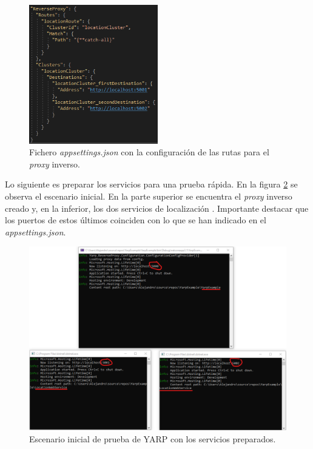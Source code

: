 \documentclass[11pt,spanish,listoffigures]{tfgetsinf}
\begin{document}
\begin{figure}[ht]
\centering
\includegraphics[width=0.5\textwidth]{imagenes/ejemploYARP/appsettings}
\caption{Fichero \emph{appsettings.json} con la configuración de las rutas para el \emph{proxy} inverso.}
	\label{ejemploYARP_appsettings}
\end{figure}

Lo siguiente es preparar los servicios para una prueba rápida. En la figura \ref{ejemploYARP_servicios_preparacion} se observa el escenario inicial. En la parte superior se encuentra el \emph{proxy} inverso creado y, en la inferior, los dos servicios de localización . Importante destacar que los puertos de estos últimos coinciden con lo que se han indicado en el \emph{appsettings.json}.

\begin{figure}[ht]
\centering
\includegraphics[width=1\textwidth]{imagenes/ejemploYARP/servicios_preparacion}
\caption{Escenario inicial de prueba de YARP con los servicios preparados.}
	\label{ejemploYARP_servicios_preparacion}
\end{figure}
\end{document}
